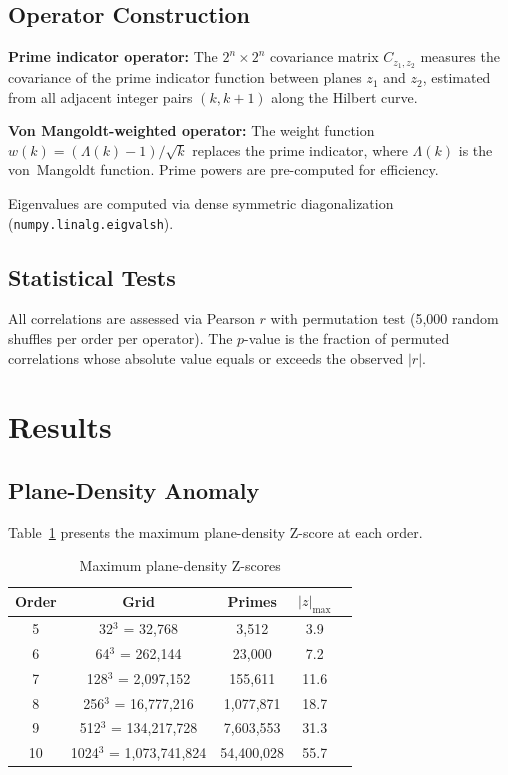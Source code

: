 \documentclass[11pt,a4paper]{article}
\begin{document}
\subsection{Operator Construction}

\textbf{Prime indicator operator:} The $2^n \times 2^n$ covariance
matrix $C_{z_1,z_2}$ measures the covariance of the prime indicator
function between planes $z_1$ and $z_2$, estimated from all adjacent
integer pairs $(k, k+1)$ along the Hilbert curve.

\textbf{Von Mangoldt-weighted operator:} The weight function $w(k) =
(\Lambda(k) - 1)/\sqrt{k}$ replaces the prime indicator, where
$\Lambda(k)$ is the von~Mangoldt function.  Prime powers are
pre-computed for efficiency.

Eigenvalues are computed via dense symmetric diagonalization
(\texttt{numpy.linalg.eigvalsh}).

\subsection{Statistical Tests}

All correlations are assessed via Pearson $r$ with permutation test
(5,000 random shuffles per order per operator).  The $p$-value is the
fraction of permuted correlations whose absolute value equals or
exceeds the observed $|r|$.

\section{Results}

\subsection{Plane-Density Anomaly}

Table~\ref{tab:density} presents the maximum plane-density Z-score
at each order.

\begin{table}[h]
\centering
\caption{Maximum plane-density Z-scores}
\label{tab:density}
\begin{tabular}{ccccc}
\toprule
Order & Grid & Primes & $|z|_{\max}$ \\
\midrule
5  & 32$^3$ = 32,768         & 3,512      & 3.9   \\
6  & 64$^3$ = 262,144        & 23,000     & 7.2   \\
7  & 128$^3$ = 2,097,152     & 155,611    & 11.6  \\
8  & 256$^3$ = 16,777,216    & 1,077,871  & 18.7  \\
9  & 512$^3$ = 134,217,728   & 7,603,553  & 31.3  \\
10 & 1024$^3$ = 1,073,741,824 & 54,400,028 & 55.7  \\
\bottomrule
\end{tabular}
\end{table}
\end{document}
